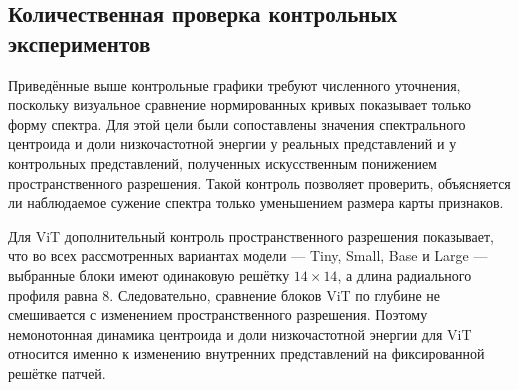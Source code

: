 \subsection{Количественная проверка контрольных экспериментов}

Приведённые выше контрольные графики требуют численного уточнения, поскольку визуальное сравнение нормированных кривых показывает только форму спектра. Для этой цели были сопоставлены значения спектрального центроида и доли низкочастотной энергии у реальных представлений и у контрольных представлений, полученных искусственным понижением пространственного разрешения. Такой контроль позволяет проверить, объясняется ли наблюдаемое сужение спектра только уменьшением размера карты признаков.

Для ViT дополнительный контроль пространственного разрешения показывает, что во всех рассмотренных вариантах модели — Tiny, Small, Base и Large — выбранные блоки имеют одинаковую решётку $14 \times 14$, а длина радиального профиля равна $8$. Следовательно, сравнение блоков ViT по глубине не смешивается с изменением пространственного разрешения. Поэтому немонотонная динамика центроида и доли низкочастотной энергии для ViT относится именно к изменению внутренних представлений на фиксированной решётке патчей.

\begin{table}[h]
\centering
\caption{Контроль влияния понижения пространственного разрешения на спектральные метрики}
\label{tab:downsampling_control_metrics}
\vspace{1ex}
\end{table}

